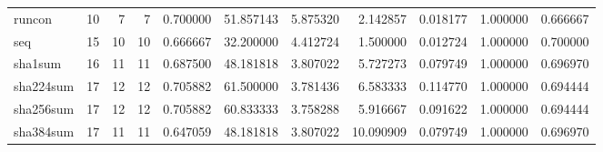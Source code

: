\begin{longtable}{lrrrrrrrrrr}
runcon    &                                      10 &                  7 &                                 7 &                                   0.700000 &                              51.857143 &                                     5.875320 &                          2.142857 &                                0.018177 &                           1.000000 &                                           0.666667 \\
seq       &                                      15 &                 10 &                                10 &                                   0.666667 &                              32.200000 &                                     4.412724 &                          1.500000 &                                0.012724 &                           1.000000 &                                           0.700000 \\
sha1sum   &                                      16 &                 11 &                                11 &                                   0.687500 &                              48.181818 &                                     3.807022 &                          5.727273 &                                0.079749 &                           1.000000 &                                           0.696970 \\
sha224sum &                                      17 &                 12 &                                12 &                                   0.705882 &                              61.500000 &                                     3.781436 &                          6.583333 &                                0.114770 &                           1.000000 &                                           0.694444 \\
sha256sum &                                      17 &                 12 &                                12 &                                   0.705882 &                              60.833333 &                                     3.758288 &                          5.916667 &                                0.091622 &                           1.000000 &                                           0.694444 \\
sha384sum &                                      17 &                 11 &                                11 &                                   0.647059 &                              48.181818 &                                     3.807022 &                         10.090909 &                                0.079749 &                           1.000000 &                                           0.696970 \\

\end{longtable}
